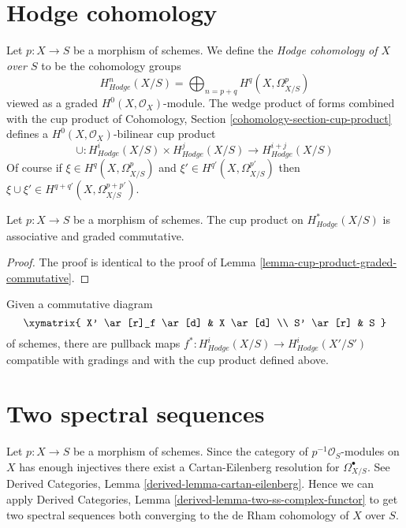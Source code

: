 \section{Hodge cohomology}
\label{section-hodge-cohomology}

\noindent
Let $p : X \to S$ be a morphism of schemes. We define the
{\it Hodge cohomology of $X$ over $S$} to be the cohomology groups
$$
H^n_{Hodge}(X/S) = \bigoplus\nolimits_{n = p + q} H^q(X, \Omega^p_{X/S})
$$
viewed as a graded $H^0(X, \mathcal{O}_X)$-module. The wedge product
of forms combined with the cup product of
Cohomology, Section \ref{cohomology-section-cup-product}
defines a $H^0(X, \mathcal{O}_X)$-bilinear cup product
$$
\cup :
H^i_{Hodge}(X/S) \times H^j_{Hodge}(X/S)
\longrightarrow
H^{i + j}_{Hodge}(X/S)
$$
Of course if  $\xi \in H^q(X, \Omega^p_{X/S})$ and
$\xi' \in H^{q'}(X, \Omega^{p'}_{X/S})$ then $\xi \cup \xi' \in
H^{q + q'}(X, \Omega^{p + p'}_{X/S})$.

\begin{lemma}
\label{lemma-cup-product-hodge-graded-commutative}
Let $p : X \to S$ be a morphism of schemes.
The cup product on $H^*_{Hodge}(X/S)$ is associative and graded commutative.
\end{lemma}

\begin{proof}
The proof is identical to the proof of
Lemma \ref{lemma-cup-product-graded-commutative}.
\end{proof}

\noindent
Given a commutative diagram
$$
\xymatrix{
X' \ar[r]_f \ar[d] & X \ar[d] \\
S' \ar[r] & S
}
$$
of schemes, there are pullback maps
$f^* : H^i_{Hodge}(X/S) \longrightarrow H^i_{Hodge}(X'/S')$
compatible with gradings and with the cup product defined above.







\section{Two spectral sequences}
\label{section-hodge-to-de-rham}

\noindent
Let $p : X \to S$ be a morphism of schemes. Since the category
of $p^{-1}\mathcal{O}_S$-modules on $X$ has enough injectives
there exist a Cartan-Eilenberg resolution for $\Omega^\bullet_{X/S}$.
See Derived Categories, Lemma \ref{derived-lemma-cartan-eilenberg}.
Hence we can apply Derived Categories, Lemma
\ref{derived-lemma-two-ss-complex-functor} to get two spectral sequences
both converging to the de Rham cohomology of $X$ over $S$.

